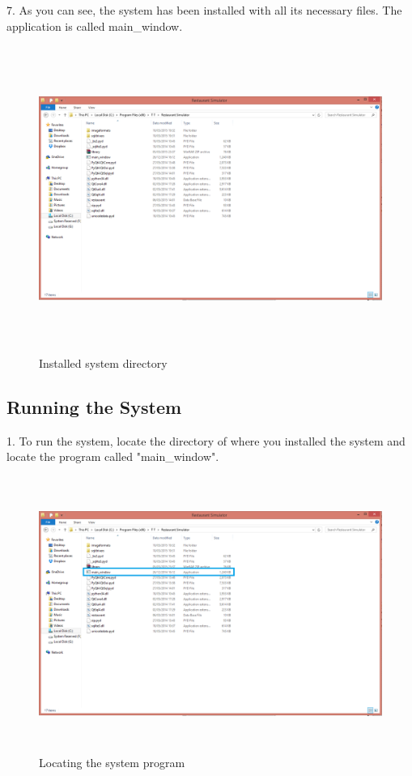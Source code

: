 \begin{landscape}
7. As you can see, the system has been installed with all its necessary files. The application is called main\_window.

\begin{figure}[H]
    \includegraphics[height = 10cm]{./Manual/images/install7} 
    \caption{Installed system directory} \label{fig:install7}
\end{figure}



\subsection{Running the System}

1. To run the system, locate the directory of where you installed the system and locate the program called "main\_window". 

\begin{figure}[H]
    \includegraphics[height = 9cm]{./Manual/images/runsystem} 
    \caption{Locating the system program} \label{fig:locateSystem}
\end{figure}


\end{landscape}
